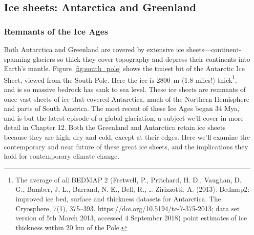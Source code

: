 \documentclass[amstex,12pt]{book}
\begin{document}
\subsection{Ice sheets: Antarctica and Greenland}

\subsubsection{Remnants of the Ice Ages} Both Antarctica and Greenland are covered by extensive ice sheets---continent-spanning glaciers so thick they cover topography and depress their continents into Earth's mantle. Figure \ref{fig:south_pole} shows the tiniest bit of the Antarctic Ice Sheet, viewed from the South Pole. Here the ice is \SI{2800}{\metre} (1.8 miles!) thick\footnote{The average of all BEDMAP 2 (Fretwell, P., Pritchard, H. D., Vaughan, D. G., Bamber, J. L., Barrand, N. E., Bell, R., … Zirizzotti, A. (2013). Bedmap2: improved ice bed, surface and thickness datasets for Antarctica. The Cryosphere, 7(1), 375–393. https://doi.org/10.5194/tc-7-375-2013; data set version of 5th March 2013, accessed 4 September 2018) point estimates of ice thickness within 20 km of the Pole.}, and is so massive bedrock has sank to sea level. These ice sheets are remnants of once vast sheets of ice that covered Antarctica, much of the Northern Hemisphere and parts of South America. The most recent of these Ice Ages began 34 Mya, and is but the latest episode of a global glaciation, a subject we'll cover in more detail in Chapter 12. Both the Greenland and Antarctica retain ice sheets because they are high, dry and cold, except at their edges. Here we'll examine the contemporary and near future of these great ice sheets, and the implications they hold for contemporary climate change.\\
\end{document}
